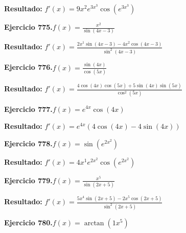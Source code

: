 \documentclass[10pt,a4paper]{article}
\begin{document}
\begin{solbox}
\textbf{Resultado:} \(\displaystyle f'(x) = 9x^{2}e^{3x^{3}}\cos(e^{3x^{3}})\)
\end{solbox}

\newpage
\begin{ejbox}
\textbf{Ejercicio 775.}\quad $f(x) = \frac{x^{2}}{\sin(4x -3)}$
\end{ejbox}

\begin{solbox}
\textbf{Resultado:} \(\displaystyle f'(x) = \frac{2x^{1}\sin(4x -3) - 4x^{2}\cos(4x -3)}{\sin^2(4x -3)}\)
\end{solbox}

\begin{ejbox}
\textbf{Ejercicio 776.}\quad $f(x) = \frac{\sin(4x)}{\cos(5x)}$
\end{ejbox}

\begin{solbox}
\textbf{Resultado:} \(\displaystyle f'(x) = \frac{4\cos(4x)\cos(5x) + 5\sin(4x)\sin(5x)}{\cos^2(5x)}\)
\end{solbox}

\begin{ejbox}
\textbf{Ejercicio 777.}\quad $f(x) = e^{4x} \cos(4x)$
\end{ejbox}

\begin{solbox}
\textbf{Resultado:} \(\displaystyle f'(x) = e^{4x}(4\cos(4x) - 4\sin(4x))\)
\end{solbox}

\newpage
\begin{ejbox}
\textbf{Ejercicio 778.}\quad $f(x) = \sin(e^{2x^{2}})$
\end{ejbox}

\begin{solbox}
\textbf{Resultado:} \(\displaystyle f'(x) = 4x^{1}e^{2x^{2}}\cos(e^{2x^{2}})\)
\end{solbox}

\begin{ejbox}
\textbf{Ejercicio 779.}\quad $f(x) = \frac{x^{5}}{\sin(2x +5)}$
\end{ejbox}

\begin{solbox}
\textbf{Resultado:} \(\displaystyle f'(x) = \frac{5x^{4}\sin(2x +5) - 2x^{5}\cos(2x +5)}{\sin^2(2x +5)}\)
\end{solbox}

\begin{ejbox}
\textbf{Ejercicio 780.}\quad $f(x) = \arctan(1x^{5})$
\end{ejbox}
\end{document}
